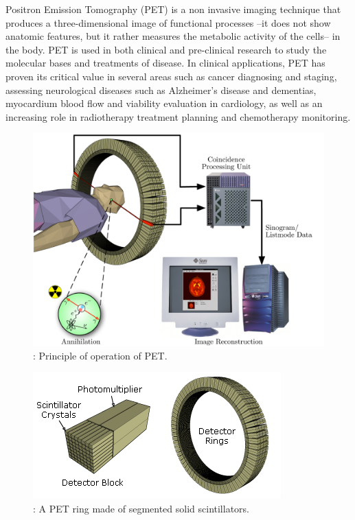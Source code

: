\documentclass[review]{elsarticle}
\begin{document}
Positron Emission Tomography (PET) is a non invasive imaging technique that produces a three-dimensional image of functional processes --it does not show anatomic features, but it rather  measures the metabolic activity of the cells-- in the body. PET is used in
both clinical and pre-clinical research to study the molecular bases and treatments of
disease. In clinical applications, PET has proven its critical value in several areas such as
cancer diagnosing and staging, assessing neurological diseases such as Alzheimer's disease
and dementias, myocardium blood flow and viability evaluation in cardiology, as well as an
increasing role in radiotherapy treatment planning and chemotherapy monitoring. 

\begin{figure}[!htb]
	\centering
	\includegraphics[scale=0.3]{../img/PET-schema.png}
	\caption{\label{fig.pet}: Principle of operation of PET. }
\end{figure}

\begin{figure}[!htb]
	\centering
	\includegraphics[scale=1.0]{../img/PET-detectorsystem_2.png}
	\caption{\label{fig.det}: A PET ring made of segmented solid scintillators. }
\end{figure}
\end{document}
